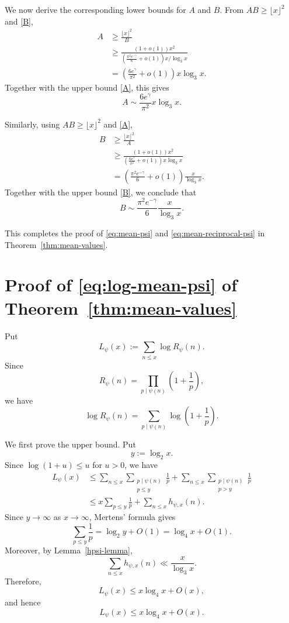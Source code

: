 \documentclass{article}
\theoremstyle{remark}
\begin{document}
We now derive the corresponding lower bounds for \(A\) and \(B\).
From \(AB\ge\lfloor x\rfloor^2\) and \eqref{B},
\[
\begin{aligned}
A
&\ge
\frac{\lfloor x\rfloor^2}{B}\\
&\ge
\frac{(1+o(1))x^2}
{\left(\frac{\pi^2e^{-\gamma}}6+o(1)\right)
x/\log_3x}\\
&=
\left(\frac{6e^\gamma}{\pi^2}+o(1)\right)
x\log_3x.
\end{aligned}
\]
Together with the upper bound \eqref{A}, this gives
\begin{equation}\label{Anormal}
{A\sim\frac{6e^\gamma}{\pi^2}x\log_3x.}
\end{equation}

Similarly, using \(AB\ge\lfloor x\rfloor^2\) and \eqref{A},
\[
\begin{aligned}
B
&\ge
\frac{\lfloor x\rfloor^2}{A}\\
&\ge
\frac{(1+o(1))x^2}
{\left(\frac{6e^\gamma}{\pi^2}+o(1)\right)
x\log_3x}\\
&=
\left(\frac{\pi^2e^{-\gamma}}6+o(1)\right)
\frac{x}{\log_3x}.
\end{aligned}
\]
Together with the upper bound \eqref{B}, we conclude that
\begin{equation}\label{Bnormal}
{B\sim\frac{\pi^2e^{-\gamma}}6\frac{x}{\log_3x}.}
\end{equation}

This completes the proof of \eqref{eq:mean-psi} and
\eqref{eq:mean-reciprocal-psi} in Theorem~\ref{thm:mean-values}.


\section{Proof of \eqref{eq:log-mean-psi} of Theorem~\ref{thm:mean-values}}

Put
\[
L_\psi(x)
:=
\sum_{n\le x}\log R_\psi(n).
\]
Since
\[
R_\psi(n)
=
\prod_{p\mid\psi(n)}
\left(1+\frac1p\right),
\]
we have
\[
\log R_\psi(n)
=
\sum_{p\mid\psi(n)}
\log\left(1+\frac1p\right).
\]

We first prove the upper bound. Put
\[
y:=\log_2x.
\]
Since \(\log(1+u)\le u\) for \(u>0\), we have
\[
\begin{aligned}
L_\psi(x)
&\le
\sum_{n\le x}
\sum_{\substack{p\mid\psi(n)\\ p\le y}}\frac1p
+
\sum_{n\le x}
\sum_{\substack{p\mid\psi(n)\\ p>y}}\frac1p\\
&\le
x\sum_{p\le y}\frac1p
+
\sum_{n\le x}h_{\psi,x}(n).
\end{aligned}
\]
Since \(y\to\infty\) as \(x\to\infty\), Mertens' formula gives
\[
\sum_{p\le y}\frac1p
=
\log_2y+O(1)
=
\log_4x+O(1).
\]
Moreover, by Lemma~\ref{hpsi-lemma},
\[
\sum_{n\le x}h_{\psi,x}(n)
\ll
\frac{x}{\log_3x}.
\]
Therefore,
\[
L_\psi(x)
\le
x\log_4x+O(x),
\]
and hence
\begin{equation}\label{L-upper}
L_\psi(x)
\le
x\log_4x+O(x).
\end{equation}
\end{document}
